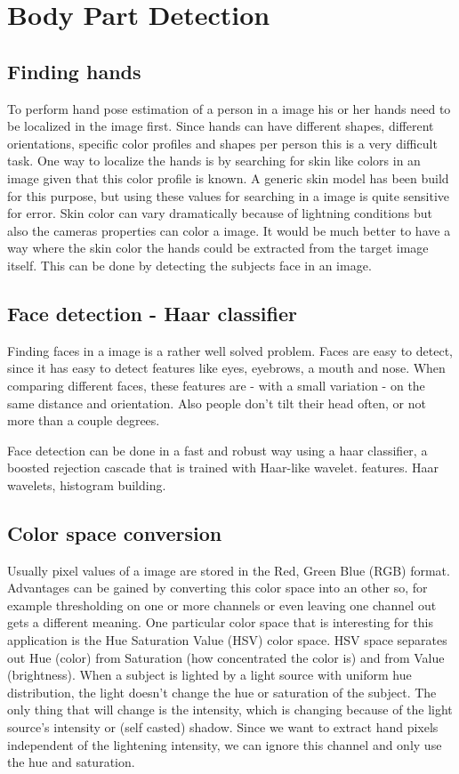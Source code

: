 \chapter{Body Part Detection}
\label{ch:bodyparts}


\section{Finding hands}
To perform hand pose estimation of a person in a image his or her hands need to be localized in the image first. Since hands can have different shapes, different orientations, specific color profiles and shapes per person this is a very difficult task. One way to localize the hands is by searching for skin like colors in an image given that this color profile is known. A generic skin model has been build for this purpose\cite{Jones99statisticalcolor}, but using these values for searching in a image is quite sensitive for error. Skin color can vary dramatically because of lightning conditions but also the cameras properties can color a image. It would be much better to have a way where the skin color the hands could be extracted from the target image itself. This can be done by detecting the subjects face in an image.

\section{Face detection - Haar classifier}
Finding faces in a image is a rather well solved problem. Faces are easy to detect, since it has easy to detect features like eyes, eyebrows, a mouth and nose. When comparing different faces, these features are - with a small variation - on the same distance and orientation. Also people don't tilt their head often, or not more than a couple degrees.

Face detection can be done in a fast and robust way using a haar classifier, a boosted rejection cascade that is trained with Haar-like wavelet.
 features\cite{Lienhart02anextended}. Haar wavelets, histogram building.


\section{Color space conversion}
Usually pixel values of a image are stored in the Red, Green Blue (RGB) format. Advantages can be gained by converting this color space into an other so, for example thresholding on one or more channels or even leaving one channel out gets a different meaning. One particular color space that is interesting for this application is the Hue Saturation Value (HSV) color space. HSV space separates out Hue (color) from Saturation (how concentrated the color is) and from Value (brightness). When a subject is lighted by a light source with uniform hue distribution, the light doesn't change the hue or saturation of the subject. The only thing that will change is the intensity, which is changing because of the light source's intensity or (self casted) shadow. Since we want to extract hand pixels independent of the lightening intensity, we can ignore this channel and only use the hue and saturation.

